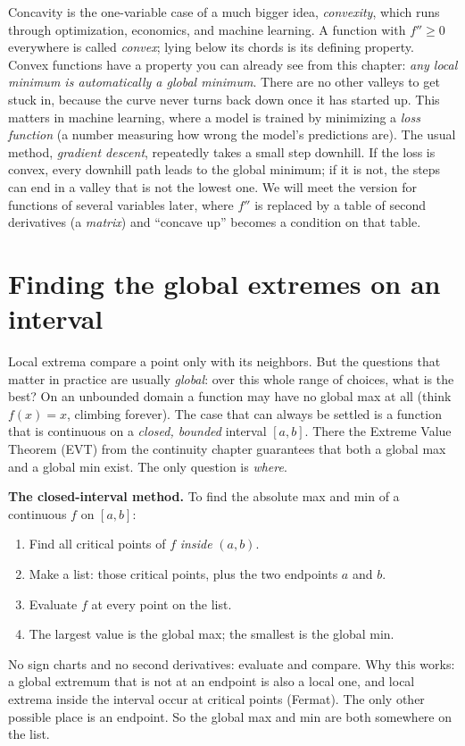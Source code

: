 \begin{connectionbox}
Concavity is the one-variable case of a much bigger idea, \emph{convexity}, which
runs through optimization, economics, and machine learning. A function with
$f''\ge0$ everywhere is called \emph{convex}; lying below its chords is its
defining property. Convex functions have a property you can already see from this
chapter: \emph{any local minimum is automatically a global minimum}. There are no
other valleys to get stuck in, because the curve never turns back down once it has
started up. This matters in machine learning, where a model is trained by
minimizing a \emph{loss function} (a number measuring how wrong the model's
predictions are). The usual method, \emph{gradient descent}, repeatedly takes a
small step downhill. If the loss is convex, every downhill path leads to the global
minimum; if it is not, the steps can end in a valley that is not the lowest one.
We will meet the version for functions of several variables later, where $f''$ is
replaced by a table of second derivatives (a \emph{matrix}) and ``concave up''
becomes a condition on that table.
\end{connectionbox}

\section{Finding the global extremes on an interval}

Local extrema compare a point only with its neighbors. But the questions that
matter in practice are usually \emph{global}: over this whole range of choices,
what is the best? On an unbounded domain a function may have no global max at all
(think $f(x)=x$, climbing forever). The case that can always be settled is a
function that is continuous on a \emph{closed, bounded} interval $[a,b]$. There the
Extreme Value Theorem (EVT) from the continuity chapter guarantees that both a
global max and a global min exist. The only question is \emph{where}.

\begin{focusbox}
\textbf{The closed-interval method.} To find the absolute max and min of a
continuous $f$ on $[a,b]$:
\begin{enumerate}
\item Find all critical points of $f$ \emph{inside} $(a,b)$.
\item Make a list: those critical points, plus the two endpoints $a$ and $b$.
\item Evaluate $f$ at every point on the list.
\item The largest value is the global max; the smallest is the global min.
\end{enumerate}
No sign charts and no second derivatives: evaluate and compare. Why this works: a
global extremum that is not at an endpoint is also a local one, and local extrema
inside the interval occur at critical points (Fermat). The only other possible
place is an endpoint. So the global max and min are both somewhere on the list.
\end{focusbox}

